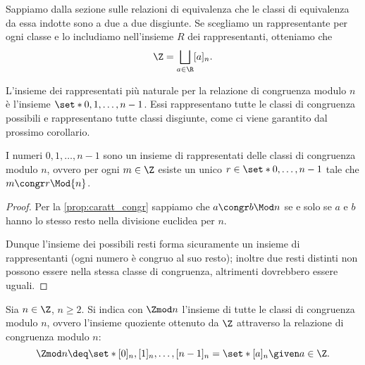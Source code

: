 Sappiamo dalla sezione sulle relazioni di equivalenza che le classi di equivalenza da essa indotte sono a due a due disgiunte. Se scegliamo un rappresentante per ogni classe e lo includiamo nell'insieme $R$ dei rappresentanti, otteniamo che \[
    \Z = \bigsqcup_{a \in \R} [a]_n. 
\]

L'insieme dei rappresentati più naturale per la relazione di congruenza modulo $n$ è l'insieme $\set*{0, 1, \dots, n-1}$. Essi rappresentano tutte le classi di congruenza possibili e rappresentano tutte classi disgiunte, come ci viene garantito dal prossimo corollario.

\begin{corollary}
    I numeri $0, 1, \dots, n-1$ sono un insieme di rappresentati delle classi di congruenza modulo $n$, ovvero per ogni $m \in \Z$ esiste un unico $r \in \set*{0, \dots, n-1}$ tale che $m \congr r \Mod{n}$.
\end{corollary}
\begin{proof}
    Per la \autoref{prop:caratt_congr} sappiamo che $a \congr b \Mod n$ se e solo se $a$ e $b$ hanno lo stesso resto nella divisione euclidea per $n$.

    Dunque l'insieme dei possibili resti forma sicuramente un insieme di rappresentanti (ogni numero è congruo al suo resto); inoltre due resti distinti non possono essere nella stessa classe di congruenza, altrimenti dovrebbero essere uguali.
\end{proof}

\begin{definition}
    Sia $n \in \Z$, $n \geq 2$. Si indica con $\Zmod n$ l'insieme di tutte le classi di congruenza modulo $n$, ovvero l'insieme quoziente ottenuto da $\Z$ attraverso la relazione di congruenza modulo $n$: \begin{equation}
        \Zmod n \deq \set*{[0]_n, [1]_n, \dots, [n-1]_n} = \set*{[a]_n \given a \in \Z}.
    \end{equation}
\end{definition}

